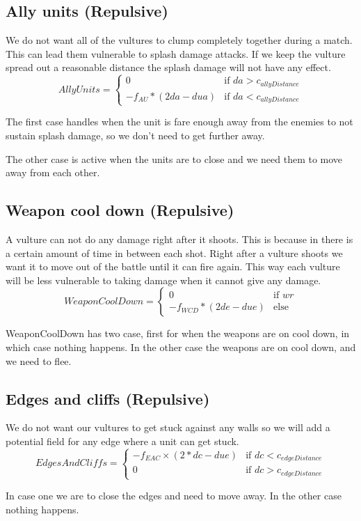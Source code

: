 	\subsection{Ally units (Repulsive)}
We do not want all of the vultures to clump completely together during a match. This can lead them vulnerable to splash damage attacks. If we keep the vulture spread out a reasonable distance the splash damage will not have any effect.
		\begin{displaymath}
			AllyUnits = \begin{cases}
					0 & \text{if } da > c_{allyDistance}\\
					-f_{AU} * (2da - dua) & \text{if } da < c_{allyDistance}
				\end{cases}		
		\end{displaymath}
	
	The first case handles when the unit is fare enough away from the enemies to not sustain splash damage, so we don't need to get further away.
	
	The other case is active when the units are to close and we need them to move away from each other.
	
	\subsection{Weapon cool down (Repulsive)}
A vulture can not do any damage right after it shoots. This is because in there is a certain amount of time in between each shot. Right after a vulture shoots we want it to move out of the battle until it can fire again. This way each vulture will be less vulnerable to taking damage when it cannot give any damage.
		\begin{displaymath}
			WeaponCoolDown = \begin{cases}
					0 & \text{if } wr\\
					-f_{WCD} * (2de - due) & \text{else}
				\end{cases}		
		\end{displaymath}

    WeaponCoolDown has two case, first for when the weapons are on cool down, in which case nothing happens. In the other case the weapons are on cool down, and we need to flee.        
    
	\subsection{Edges and cliffs (Repulsive)}
		We do not want our vultures to get stuck against any walls so we will add a potential field for any edge where a unit can get stuck.
		\begin{displaymath}
			EdgesAndCliffs = \begin{cases}
					-f_{EAC} \times {(2*dc - due)} & \text{if } dc < c_{edgeDistance}\\
					0 & \text{if } dc > c_{edgeDistance}
				\end{cases}		
		\end{displaymath}

    In case one we are to close the edges and need to move away. In the other case nothing happens.   

